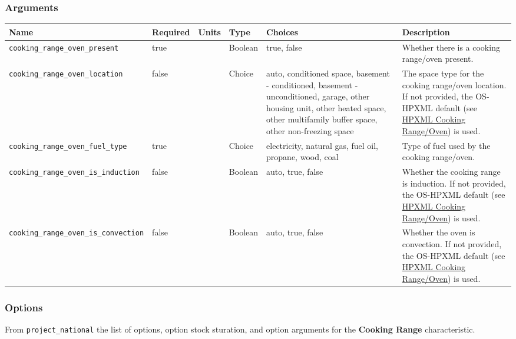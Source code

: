 \subsubsection{Arguments}\label{arguments-11}

\begin{longtable}[]{@{}llllll@{}}
\toprule\noalign{}
Name & Required & Units & Type & Choices & Description \\
\midrule\noalign{}
\endhead
\bottomrule\noalign{}
\endlastfoot
\texttt{cooking\_range\_oven\_present} & true & & Boolean & true, false
& Whether there is a cooking range/oven present. \\
\texttt{cooking\_range\_oven\_location} & false & & Choice & auto,
conditioned space, basement - conditioned, basement - unconditioned,
garage, other housing unit, other heated space, other multifamily buffer
space, other non-freezing space & The space type for the cooking
range/oven location. If not provided, the OS-HPXML default (see
\href{https://openstudio-hpxml.readthedocs.io/en/v1.7.0/workflow_inputs.html\#hpxml-cooking-range-oven}{HPXML
Cooking Range/Oven}) is used. \\
\texttt{cooking\_range\_oven\_fuel\_type} & true & & Choice &
electricity, natural gas, fuel oil, propane, wood, coal & Type of fuel
used by the cooking range/oven. \\
\texttt{cooking\_range\_oven\_is\_induction} & false & & Boolean & auto,
true, false & Whether the cooking range is induction. If not provided,
the OS-HPXML default (see
\href{https://openstudio-hpxml.readthedocs.io/en/v1.7.0/workflow_inputs.html\#hpxml-cooking-range-oven}{HPXML
Cooking Range/Oven}) is used. \\
\texttt{cooking\_range\_oven\_is\_convection} & false & & Boolean &
auto, true, false & Whether the oven is convection. If not provided, the
OS-HPXML default (see
\href{https://openstudio-hpxml.readthedocs.io/en/v1.7.0/workflow_inputs.html\#hpxml-cooking-range-oven}{HPXML
Cooking Range/Oven}) is used. \\
\end{longtable}

\subsubsection{Options}\label{options-20}

From \texttt{project\_national} the list of options, option stock
sturation, and option arguments for the \textbf{Cooking Range}
characteristic.

